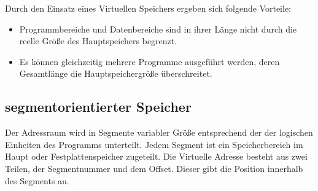 \documentclass[12pt,a4paper]{article}
\begin{document}
\newpage
\noindent Durch den Einsatz eines Virtuellen Speichers ergeben sich folgende Vorteile:
\begin{itemize}
\item Programmbereiche und Datenbereiche sind in ihrer Länge nicht durch die reelle Größe des Hauptspeichers begrenzt.
\item Es können gleichzeitig mehrere Programme ausgeführt werden, deren Gesamtlänge die Hauptspeichergröße überschreitet.
\end{itemize}
\subsection{segmentorientierter Speicher}
\noindent Der Adressraum wird in Segmente variabler Größe entsprechend der der logischen Einheiten des Programms unterteilt. Jedem Segment ist ein Speicherbereich im Haupt oder Festplattenspeicher zugeteilt. Die Virtuelle Adresse besteht aus zwei Teilen, der Segmentnummer und dem Offset. Dieser gibt die Position innerhalb des Segments an.
\end{document}
